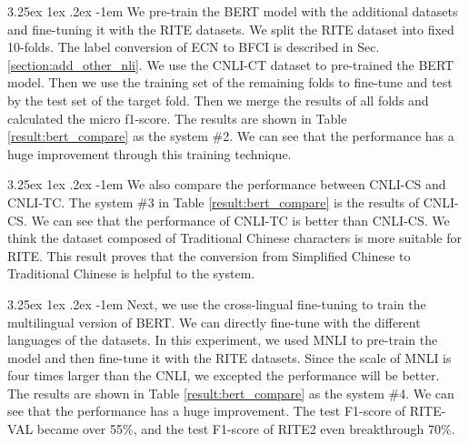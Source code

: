 \documentclass[12pt]{article}
\makeatletter
\renewcommand\paragraph{\@startsection{paragraph}{5}{\z@}%
  {3.25ex \@plus1ex \@minus.2ex}%
  {-1em}%
  {\normalfont\normalsize\bfseries}}
\makeatother
\begin{document}
\begin{CJK*}{UTF8}{bkai}
\begin{spacing}{1.77}
\paragraph{}
We pre-train the BERT model with the additional datasets and fine-tuning it with the RITE datasets. We split the RITE dataset into fixed 10-folds. The label conversion of ECN to BFCI is described in Sec. \ref{section:add_other_nli}. We use the CNLI-CT dataset to pre-trained the BERT model. Then we use the training set of the remaining folds to fine-tune and test by the test set of the target fold. Then we merge the results of all folds and calculated the micro f1-score. The results are shown in Table \ref{result:bert_compare} as the system \#2. We can see that the performance has a huge improvement through this training technique.

\paragraph{}
We also compare the performance between CNLI-CS and CNLI-TC. The system \#3 in Table \ref{result:bert_compare} is the results of CNLI-CS. We can see that the performance of CNLI-TC is better than CNLI-CS. We think the dataset composed of Traditional Chinese characters is more suitable for RITE. This result proves that the conversion from Simplified Chinese to Traditional Chinese is helpful to the system.

\paragraph{}
Next, we use the cross-lingual fine-tuning to train the multilingual version of BERT. We can directly fine-tune with the different languages of the datasets. In this experiment, we used MNLI to pre-train the model and then fine-tune it with the RITE datasets. Since the scale of MNLI is four times larger than the CNLI, we excepted the performance will be better. The results are shown in Table \ref{result:bert_compare} as the system \#4. We can see that the performance has a huge improvement. The test F1-score of RITE-VAL became over 55\%, and the test F1-score of RITE2 even breakthrough 70\%.


\end{spacing}
\end{CJK*}
\end{document}
